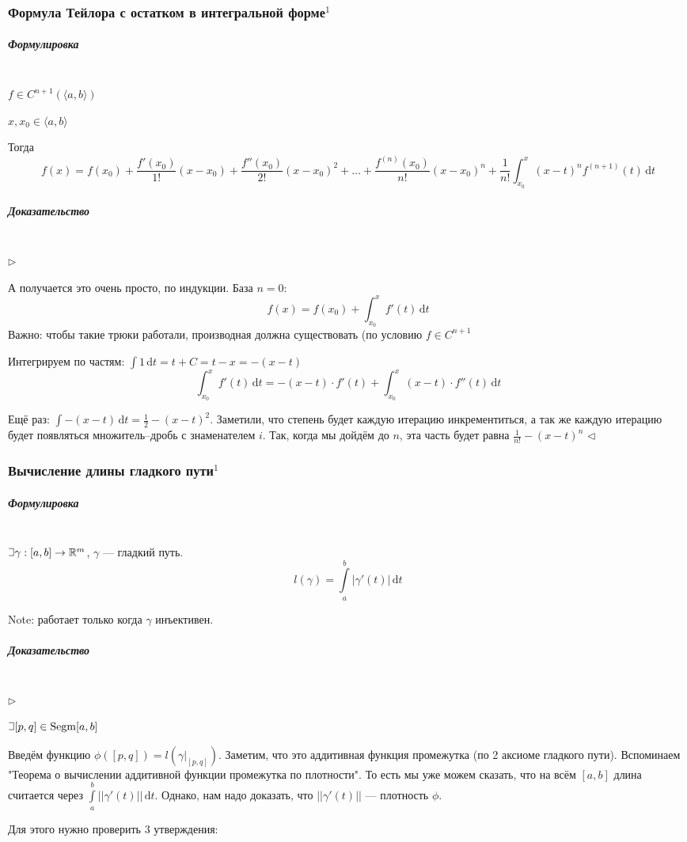 \documentclass{article}
\def\letus{%
\mathord{\setbox0=\hbox{$\exists$}%
         \hbox{\kern 0.125\wd0%
               \vbox to \ht0{%
                  \hrule width 0.75\wd0%
                  \vfill%
                  \hrule width 0.75\wd0}%
               \vrule height \ht0%
               \kern 0.125\wd0}%
       }%
        }
\DeclareMathOperator{\segm}{Segm}
\def\D{\,\mathrm{d}}
\let\vanillasubparagraph\subparagraph
\renewcommand{\subparagraph}[1]{\vanillasubparagraph{#1}\mbox{}\\}
\begin{document}
\subsubsection{Формула Тейлора с остатком в интегральной форме\texorpdfstring{$^1$}{}}
\subparagraph{Формулировка}
$f \in C^{n+1}(\langle a, b\rangle)$

$x, x_0 \in \langle a, b \rangle$

Тогда
$$
f(x) = f(x_0) + \frac{f'(x_0)}{1!}(x-x_0) + \frac{f''(x_0)}{2!}(x-x_0)^2 + \ldots + \frac{f^{(n)}(x_0)}{n!}(x-x_0)^n + \frac{1}{n!}\int_{x_0}^x (x-t)^n f^{(n+1)}(t)\D t
$$

\subparagraph{Доказательство}
$\rhd$

А получается это очень просто, по индукции.
База $n = 0$:
$$
f(x) = f(x_0) + \int_{x_0}^x f'(t) \D t
$$
Важно: чтобы такие трюки работали, производная должна существовать (по условию $f \in C^{n+1}$

Интегрируем по частям:
$\int 1 \D t = t + C = t - x = -(x - t)$
$$
\int_{x_0}^x f'(t) \D t = -(x - t) \cdot f'(t) + \int_{x_0}^x (x - t) \cdot f''(t) \D t
$$

Ещё раз:
$\int -(x - t) \D t = \frac{1}{2} -(x - t)^2$. Заметили, что степень будет каждую итерацию инкрементиться, а так же каждую итерацию будет появляться множитель--дробь с знаменателем $i$. Так, когда мы дойдём до $n$, эта часть будет равна $\frac{1}{n!} -(x-t)^n$
$\lhd$


\subsubsection{Вычисление длины гладкого пути\texorpdfstring{$^1$}{}}
\subparagraph{Формулировка}
$\letus \gamma: [a, b] \rightarrow \mathbb{R}^m$, $\gamma$ --- гладкий путь.
$$
l(\gamma) = \int\limits_a^b |\gamma'(t)| \D t
$$

Note: работает только когда $\gamma$ инъективен.

\subparagraph{Доказательство}
$\rhd$

$\letus [p, q] \in \segm[a, b]$

Введём функцию $\phi([p, q]) = l(\gamma|_{[p, q]})$. Заметим, что это аддитивная функция промежутка (по 2 аксиоме гладкого пути). Вспоминаем "Теорема о вычислении аддитивной функции промежутка по плотности". То есть мы уже можем сказать, что на всём $[a, b]$ длина считается через $\int\limits_a^b ||\gamma'(t)|| \D t$. Однако, нам надо доказать, что $||\gamma'(t)||$ --- плотность $\phi$.

Для этого нужно проверить 3 утверждения:
\end{document}
